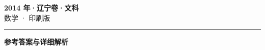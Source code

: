 \documentclass[zihao=5, a4paper]{ctexart}
\begin{document}
\begin{center}
  {\Large\bfseries 2014 年·辽宁卷·文科}\\[4pt]
  {\large 数学 · 印刷版}
\end{center}
\medskip
{}

\par\bigskip\hrule\bigskip
{}
\Needspace{0.55\textheight}
\begin{center}{\large\bfseries 参考答案与详细解析}\end{center}
\smallskip

\end{document}

